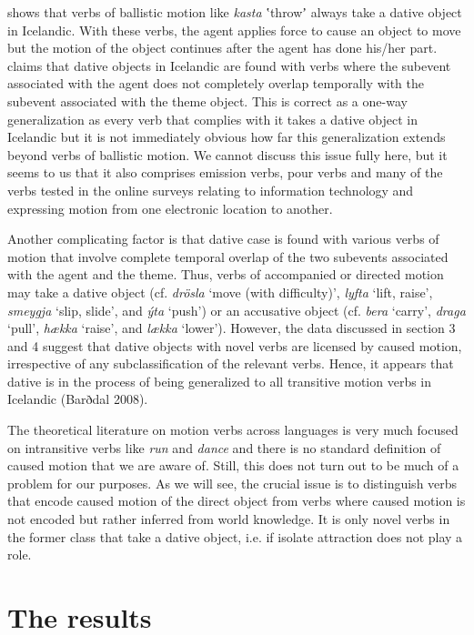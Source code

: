 \documentclass[output=paper,modfonts,nonflat]{langsci/langscibook}
\begin{document}
\citet{Svenonius2002} shows that verbs of ballistic motion like \textit{kasta} ʽthrowʼ always take a dative object in Icelandic. With these verbs, the agent applies force to cause an object to move but the motion of the object continues after the agent has done his/her part. \citet{Svenonius2002} claims that dative objects in Icelandic are found with verbs where the subevent associated with the agent does not completely overlap temporally with the subevent associated with the theme object. This is correct as a one-way generalization as every verb that complies with it takes a dative object in Icelandic but it is not immediately obvious how far this generalization extends beyond verbs of ballistic motion. We cannot discuss this issue fully here, but it seems to us that it also comprises emission verbs, pour verbs and many of the verbs tested in the online surveys relating to information technology and expressing motion from one electronic location to another. 

Another complicating factor is that dative case is found with various verbs of motion that involve complete temporal overlap of the two subevents associated with the agent and the theme. Thus, verbs of accompanied or directed motion may take a dative object (cf. \textit{drösla} ‘move (with difficulty)’, \textit{lyfta} ‘lift, raise’, \textit{smeygja} ‘slip, slide’, and \textit{ýta} ‘push’) or an accusative object (cf. \textit{bera} ‘carry’, \textit{draga} ‘pull’, \textit{hækka} ‘raise’, and \textit{lækka} ‘lower’). However, the data discussed in section 3 and 4 suggest that dative objects with novel verbs are licensed by caused motion, irrespective of any subclassification of the relevant verbs. Hence, it appears that dative is in the process of being generalized to all transitive motion verbs in Icelandic (Barðdal 2008).

The theoretical literature on motion verbs across languages is very much focused on intransitive verbs like \textit{run} and \textit{dance} and there is no standard definition of caused motion that we are aware of. Still, this does not turn out to be much of a problem for our purposes. As we will see, the crucial issue is to distinguish verbs that encode caused motion of the direct object from verbs where caused motion is not encoded but rather inferred from world knowledge. It is only novel verbs in the former class that take a dative object, i.e. if isolate attraction does not play a role.

\section{The results} %
\end{document}
